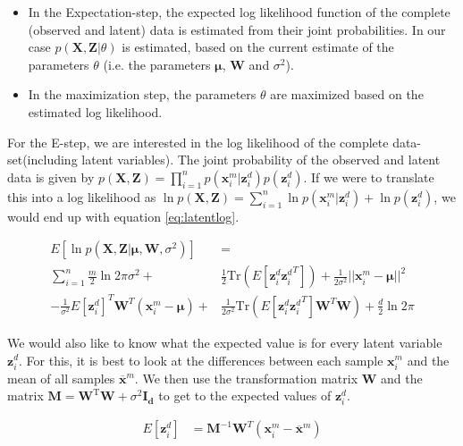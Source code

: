  \begin{itemize}
     \item In the Expectation-step, the expected log likelihood function of the complete (observed and latent) data is estimated from their joint probabilities. In our case $p(\textbf{X},\textbf{Z}|\theta)$ is estimated, based on the current estimate of the parameters $\theta$ (i.e. the parameters $\bm{\mu}$, $\textbf{W}$ and $\sigma^2$).
     \item In the maximization step, the parameters $\theta$ are maximized based on the estimated log likelihood.
 \end{itemize}
 
 
For the E-step, we are interested in the log likelihood of the complete data-set(including latent variables). The joint probability of the observed and latent data is given by $p(\textbf{X},\textbf{Z}) = \prod_{i=1}^{n} p(\textbf{x}^m_i | \textbf{z}^d_i)p(\textbf{z}_i^d)$. If we were to translate this into a log likelihood as $\ln p(\textbf{X},\textbf{Z}) = \sum_{i=1}^{n} \ln p(\textbf{x}^m_i | \textbf{z}^d_i)+ \ln p(\textbf{z}_i^d)$, we would end up with equation \ref{eq:latentlog}.

\begin{equation}\label{eq:latentlog}
\begin{split}
    E[\ln p(\textbf{X},\textbf{Z}|\bm{\mu}, \textbf{W}, \sigma^2)] &=\\ \sum_{i=1}^{n} \frac{m}{2} \ln{2\pi \sigma^2} +& \frac{1}{2} \text{Tr}(E[{\textbf{z}^d_i}{\textbf{z}^d_i}^T]) 
    + \frac{1}{2\sigma^2}||\textbf{x}^m_i -\bm{\mu}||^2\\  - \frac{1}{\sigma^2}E[\textbf{z}^d_i]^T\textbf{W}^T (\textbf{x}^m_i-\bm{\mu})
    +& \frac{1}{2\sigma^2}\text{Tr}(E[\textbf{z}^d_i{\textbf{z}^d_i}^T]\textbf{W}^T\textbf{W})
    + \frac{d}{2}\ln{2\pi}
\end{split}
\end{equation}
 
 We would also like to know what the expected value is for every latent variable $\textbf{z}^d_i$. For this, it is best to look at the differences between each sample $\textbf{x}^m_i$ and the mean of all samples $\overline{\textbf{x}}^m$. We then use the transformation matrix $\textbf{W}$ and the matrix $\textbf{M} = \textbf{W}^\text{T}\textbf{W} + \sigma^2 \bm{I_d}$ to get to the expected values of $\textbf{z}^d_i$.
 
 \begin{equation}
     \begin{split}
         E[\textbf{z}^d_i] &= \textbf{M}^{-1}\textbf{W}^T(\textbf{x}^m_i-\overline{\textbf{x}}^m)
     \end{split}
 \end{equation}
 
